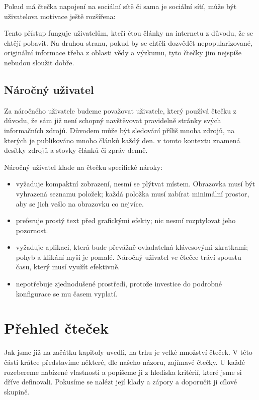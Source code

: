 Pokud má čtečka napojení na sociální sítě či sama je sociální sítí, může být uživatelova motivace ještě rozšířena:

Tento přístup funguje uživatelům, kteří čtou články na internetu z důvodu, že se chtějí pobavit.
Na druhou stranu, pokud by se chtěli dozvědět nepopularizované, originální informace třeba z oblasti vědy a výzkumu, tyto čtečky jim nejspíše nebudou sloužit dobře.

\subsection{Náročný uživatel}\label{ssec:narocny-uzivatel}

Za náročného uživatele budeme považovat uživatele, který používá čtečku z důvodu, že sám již není schopný navštěvovat pravidelně stránky svých informačních zdrojů.
Důvodem může být sledování příliš mnoha zdrojů, na kterých je publikováno mnoho článků každý den.
 v tomto kontextu znamená desítky zdrojů a stovky článků či zpráv denně.

Náročný uživatel klade na čtečku specifické nároky:
\begin{itemize}
    \item vyžaduje kompaktní zobrazení, nesmí se plýtvat místem.
        Obrazovka musí být vyhrazená seznamu položek; každá položka musí zabírat minimální prostor, aby se jich vešlo na obrazovku co nejvíce.
    \item preferuje prostý text před grafickými efekty; nic nesmí rozptylovat jeho pozornost.
    \item vyžaduje aplikaci, která bude převážně ovladatelná klávesovými zkratkami; pohyb a klikání myši je pomalé.
        Náročný uživatel ve čtečce tráví spoustu času, který musí využít efektivně.
    \item nepotřebuje zjednodušené prostředí, protože investice do podrobné konfigurace se mu časem vyplatí.
\end{itemize}

\section{Přehled čteček}

Jak jsme již na začátku kapitoly uvedli, na trhu je velké množství čteček.
V této části krátce představíme některé, dle našeho názoru, zajímavé čtečky.
U každé rozebereme nabízené vlastnosti a popíšeme ji z hlediska kritérií, které jsme si dříve definovali.
Pokusíme se nalézt její klady a zápory a doporučit ji cílové skupině.


